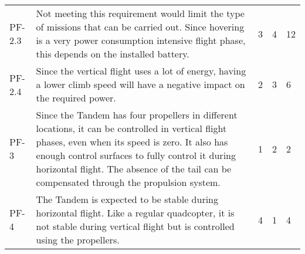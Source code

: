\begin{table}[]
\begin{tabularx}{\textwidth}{l L l l l}
        \\ \hdashline
        PF-2.3          & Not meeting this requirement would limit the type of missions that can be carried out. Since hovering is a very power consumption intensive flight phase, this depends on the installed battery.       & 3 & 4 & 12
        \\ \hdashline
        PF-2.4          & Since the vertical flight uses a lot of energy, having a lower climb speed will have a negative impact on the required power.              & 2 & 3  & 6
        \\ \hdashline
        PF-3            & Since the Tandem has four propellers in different locations, it can be controlled in vertical flight phases, even when its speed is zero. It also has enough control surfaces to fully control it during horizontal flight. The absence of the tail can be compensated through the propulsion system.      & 1        & 2 & 2
        \\ \hdashline
        PF-4            & The Tandem is expected to be stable during horizontal flight. Like a regular quadcopter, it is not stable during vertical flight but is controlled using the propellers.     & 4 & 1 & 4
        \\ \bottomrule
    \end{tabularx}
\end{table}




